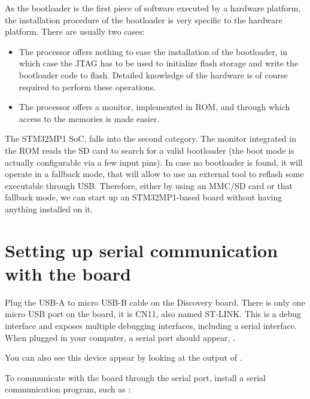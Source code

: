 
As the bootloader is the first piece of software executed by a
hardware platform, the installation procedure of the bootloader is
very specific to the hardware platform. There are usually two cases:

\begin{itemize}

\item The processor offers nothing to ease the installation of the
  bootloader, in which case the JTAG has to be used to initialize
  flash storage and write the bootloader code to flash. Detailed
  knowledge of the hardware is of course required to perform these
  operations.

\item The processor offers a monitor, implemented in ROM, and through
  which access to the memories is made easier.

\end{itemize}

The STM32MP1 SoC, falls into the second category. The monitor
integrated in the ROM reads the SD card to search for a valid
bootloader (the boot mode is actually configurable via a few input
pins). In case no bootloader is found, it will operate in a fallback
mode, that will allow to use an external tool to reflash some
executable through USB. Therefore, either by using an MMC/SD card or
that fallback mode, we can start up an STM32MP1-based board without
having anything installed on it.

\section{Setting up serial communication with the board}

Plug the USB-A to micro USB-B cable on the Discovery board. There is
only one micro USB port on the board, it is CN11, also named ST-LINK.
This is a debug interface and exposes multiple debugging interfaces,
including a serial interface. When plugged in your computer, a serial
port should appear, .

You can also see this device appear by looking at the output of
.

To communicate with the board through the serial port, install a
serial communication program, such as :

